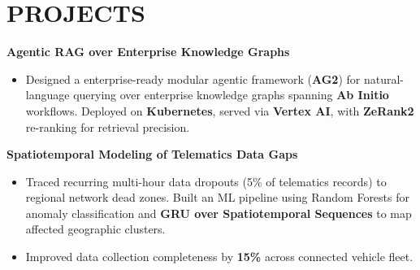 \documentclass[9pt]{article}
\begin{document}
\vspace{-1pt}

\section*{PROJECTS}
\textbf{Agentic RAG over Enterprise Knowledge Graphs}
\begin{itemize}
    \item Designed a enterprise-ready modular agentic  framework (\textbf{AG2}) for natural-language querying over enterprise knowledge graphs spanning \textbf{Ab Initio} workflows. Deployed on \textbf{Kubernetes}, served via \textbf{Vertex AI}, with \textbf{ZeRank2} re-ranking for retrieval precision.
\end{itemize}
\textbf{Spatiotemporal Modeling of Telematics Data Gaps}
\begin{itemize}
    \item Traced recurring multi-hour data dropouts (5\% of telematics records) to regional network dead zones. Built an ML pipeline using Random Forests for anomaly classification and \textbf{GRU over Spatiotemporal Sequences} to map affected geographic clusters.
    \item Improved data collection completeness by \textbf{15\%} across connected vehicle fleet.
\end{itemize}
\end{document}
